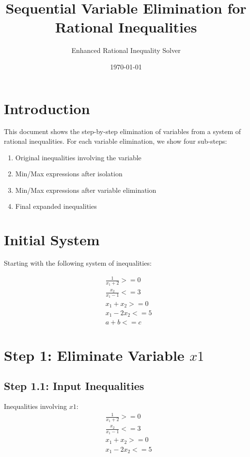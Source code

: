 \documentclass{article}
\title{Sequential Variable Elimination for Rational Inequalities}
\author{Enhanced Rational Inequality Solver}
\date{\today}
\begin{document}
\maketitle

\section{Introduction}

This document shows the step-by-step elimination of variables from a system of rational inequalities. 
For each variable elimination, we show four sub-steps:
\begin{enumerate}
\item Original inequalities involving the variable
\item Min/Max expressions after isolation
\item Min/Max expressions after variable elimination
\item Final expanded inequalities
\end{enumerate}

\section{Initial System}

Starting with the following system of inequalities:

\begin{align}
& \frac{1}{x_{1} + 2} >= 0 \\
& \frac{x_{2}}{x_{1} - 1} <= 3 \\
& x_{1} + x_{2} >= 0 \\
& x_{1} - 2 x_{2} <= 5 \\
& a + b <= c
\end{align}

\section{Step 1: Eliminate Variable $x1$}

\subsection{Step 1.1: Input Inequalities}

Inequalities involving $x1$:
\begin{align}
& \frac{1}{x_{1} + 2} >= 0 \\
& \frac{x_{2}}{x_{1} - 1} <= 3 \\
& x_{1} + x_{2} >= 0 \\
& x_{1} - 2 x_{2} <= 5
\end{align}
\end{document}
